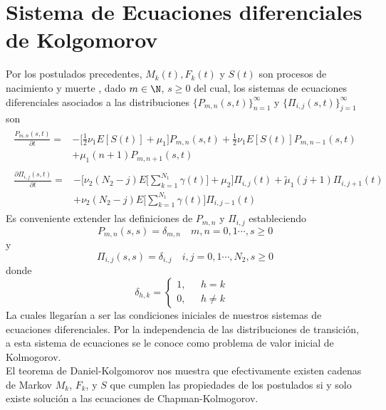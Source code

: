 \section{Sistema de Ecuaciones diferenciales de Kolgomorov}
Por los postulados precedentes, $M_k(t), F_k(t)$ y $S(t)$ son procesos de nacimiento y muerte , dado $m\in\N$, $s\geq 0$ del cual, los sistemas de ecuaciones diferenciales asociados a las distribuciones $\{P_{m,n}(s,t)\}_{n=1}^\infty$ y $\{\Pi_{i,j}(s,t)\}_{j=1}^\infty$ son
\begin{eqnarray}
    \begin{array}{cr}
        \frac{P_{m,n}(s,t)}{\partial t} = & -\bigg[\frac{1}{2}\nu_1E[S(t)]+\mu_1\bigg]P_{m,n}(s,t)+\frac{1}{2}\nu_1E[S(t)]P_{m,n-1}(s,t) \\
        & +\mu_1 (n+1)P_{m,n+1}(s,t)
    \end{array}
    \label{tesis-edo-p_n}
\end{eqnarray}
\begin{eqnarray}
    \begin{array}{cr}
     \frac{\partial\Pi_{i,j}(s,t)}{\partial t}= & -\bigg[\nu_2(N_2-j)E\big[\sum_{k=1}^{N_1}\gamma(t)\big]+\mu_2\bigg]\Pi_{i,j}(t)
     +\tilde{\mu}_1 (j+1)\Pi_{i,j+1}(t)
     \\&+\nu_2(N_2-j)E\big[\sum_{k=1}^{N_1}\gamma(t)\big]\Pi_{i,j-1}(t)
    \end{array}
\end{eqnarray}Es conveniente extender las definiciones de $P_{m,n}$ y $\Pi_{i,j}$ estableciendo $$P_{m,n}(s,s)=\delta_{m,n}\quad m,n=0,1\cdots, s\geq 0$$
y
$$\Pi_{i,j}(s,s)=\delta_{i,j}\quad i,j=0,1\cdots,N_2, s\geq 0$$
donde 
$$\delta_{h,k}=
    \begin{cases}
    1, & \mbox{ $h=k$ } \\
    0, & \mbox{ $h\not=k$}
    \end{cases}$$
La cuales llegarían a ser las condiciones iniciales de nuestros sistemas de ecuaciones diferenciales.
Por la independencia de las distribuciones de transición, a esta sistema de ecuaciones se le conoce como problema de valor inicial de Kolmogorov.\\ El teorema de Daniel-Kolgomorov nos muestra que efectivamente existen cadenas de Markov $M_k$, $F_k$, y $S$ que cumplen las propiedades de los postulados si y solo existe solución a las ecuaciones de Chapman-Kolmogorov.
